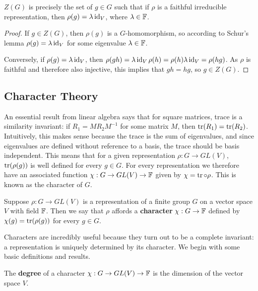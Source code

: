 \documentclass[a4paper]{article}
\begin{document}
\begin{cor}
    $Z(G)$ is precisely the set of $g \in G$ such that if $\rho$ is a faithful irreducible representation, then $\rho(g) = \lambda \operatorname{id}_V$, where $\lambda \in \mathbb{F}$. 
\end{cor}

\begin{proof}
    If $g \in Z(G)$, then $\rho(g)$ is a $G$-homomorphism, so according to Schur's lemma $\rho(g) = \lambda \operatorname{id}_V$ for some eigenvalue $\lambda \in \mathbb{F}$.

    Conversely, if $\rho(g) = \lambda \operatorname{id}_V$, then $\rho(gh) = \lambda \operatorname{id}_V \rho(h) = \rho(h) \lambda \operatorname{id}_V = \rho(hg)$. As $\rho$ is faithful and therefore also injective, this implies that $gh = hg$, so $g \in Z(G)$.
\end{proof}

\subsection{Character Theory}
An essential result from linear algebra says that for square matrices, trace is a similarity invariant: if $R_1 = MR_2M^{-1}$ for some matrix $M$, then $\operatorname{tr}(R_1) = \operatorname{tr}(R_2)$. Intuitively, this makes sense because the trace is the sum of eigenvalues, and 
since eigenvalues are defined without reference to a basis, the trace should be basis independent. This means that for a given representation $\rho : G \to GL(V)$, $\operatorname{tr}(\rho(g))$ is well defined for every $g \in G$. For every representation we therefore have an associated function $\chi : G \to GL(V) \to \mathbb{F}$ given by $\chi = \operatorname{tr} \circ \rho$. This is known as the character of $G$.

\begin{defi}[Character]
    Suppose $\rho : G \to GL(V)$ is a representation of a finite group $G$ on a vector space $V$ with field $\mathbb{F}$. Then we say that $\rho$ affords a \textbf{character} $\chi: G \to \mathbb{F}$ defined by $\chi(g) = \operatorname{tr}(\rho(g))$ for every $g \in G$.
\end{defi}

Characters are incredibly useful because they turn out to be a complete invariant: a representation is uniquely determined by its character. We begin with some basic definitions and results. 

\begin{defi}[Degree]
    The \textbf{degree} of a character $\chi : G \to GL(V) \to \mathbb{F}$ is the dimension of the vector space $V$.
\end{defi}
\end{document}
